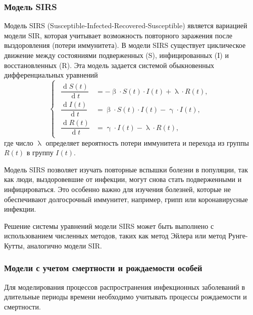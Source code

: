 \documentclass[a4paper, 12pt]{extarticle}
\numberwithin{equation}{section}
\renewcommand{\beta}{\upbeta}
\renewcommand{\gamma}{\upgamma}
\renewcommand{\lambda}{\uplambda}
\renewcommand{\d}{\operatorname{d}}
\begin{document}
	\subsubsection{Модель SIRS}
	Модель SIRS (Susceptible-Infected-Recovered-Susceptible) является вариацией модели SIR, которая учитывает возможность повторного заражения после выздоровления (потери иммунитета). В модели SIRS существует циклическое движение между состояниями подверженных (S), инфицированных (I) и восстановленных (R). Эта модель задается системой обыкновенных дифференциальных уравнений
	\begin{equation}
		\left\{ 
		\begin{gathered} 
			\begin{aligned}
				\dfrac {\d S(t)}{\d t} &= -\beta \cdot S(t) \cdot I(t) + \lambda \cdot R(t),\\
				\dfrac{\d I(t)}{\d t} &= \beta \cdot S(t)\cdot I(t) - \gamma\cdot I(t),\\
				\dfrac{\d R(t)}{\d t} &= \gamma\cdot I(t) - \lambda \cdot R(t),
			\end{aligned}
		\end{gathered} 
		\right.
	\end{equation}
	где число $\lambda$ определяет вероятность потери иммунитета и перехода из группы $R(t)$ в группу $I(t)$.
	
	Модель SIRS позволяет изучать повторные вспышки болезни в популяции, так как люди, выздоровевшие от инфекции, могут снова стать подверженными и инфицироваться. Это особенно важно для изучения болезней, которые не обеспечивают долгосрочный иммунитет, например, грипп или коронавирусные инфекции.
	
	Решение системы уравнений модели SIRS может быть выполнено с использованием численных методов, таких как метод Эйлера или метод Рунге-Кутты, аналогично модели SIR.
	
	\subsubsection{Модели с учетом смертности и рождаемости особей}
	Для моделирования процессов распространения инфекционных заболеваний в длительные периоды времени необходимо учитывать процессы рождаемости и смертности.
	
\end{document}
